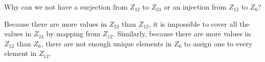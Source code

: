 \question Why can we not have a surjection from $Z_{12}$ to $Z_{24}$ 
or an injection from  $Z_{12}$ to $Z_{6}$?

\begin{solution}
Because there are more values in $Z_{24}$ than $Z_{12}$, it is 
impossible to cover all the values in $Z_{24}$ by mapping from 
$Z_{12}$. Similarly, because there are more values in $Z_{12}$ than 
$Z_{6}$, there are not enough unique elements in $Z_{6}$ to assign one to every element in 
$Z_{12}$.
\end{solution}

\clearpage